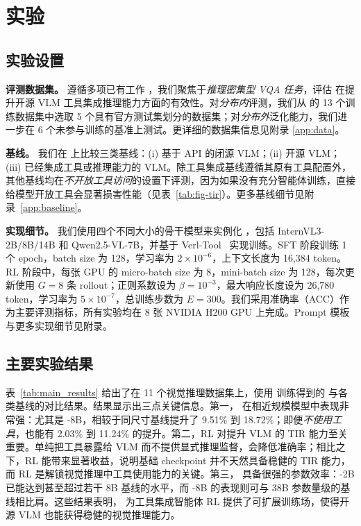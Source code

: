 

\section{实验}
\label{sec:exp}

\subsection{实验设置}
\noindent \textbf{评测数据集。}
遵循多项已有工作 \cite{liu2025visionreasoner,huang2025vision,han2025tiger,li2025self}，我们聚焦于\emph{推理密集型 VQA 任务}，评估 \env{} 在提升开源 VLM 工具集成推理能力方面的有效性。对\emph{分布内}评测，我们从 \env{} 的 13 个训练数据集中选取 5 个具有官方测试集划分的数据集；对\emph{分布外}泛化能力，我们进一步在 6 个未参与训练的基准上测试。更详细的数据集信息见附录 \ref{app:data}。

\noindent \textbf{基线。}
我们在 \env{} 上比较三类基线：(i) 基于 API 的闭源 VLM；(ii) 开源 VLM；(iii) 已经集成工具或推理能力的 VLM。除工具集成基线遵循其原有工具配置外，其他基线均在\emph{不开放工具访问}的设置下评测，因为如果没有充分智能体训练，直接给模型开放工具会显著损害性能（见表~\ref{tab:fig-tir}）。更多基线细节见附录~\ref{app:baseline}。

\noindent \textbf{实现细节。}
我们使用四个不同大小的骨干模型来实例化 \ours{}，包括 InternVL3-2B/8B/14B 和 Qwen2.5-VL-7B，并基于 Verl-Tool~\cite{jiang2025verltool} 实现训练。SFT 阶段训练 1 个 epoch，batch size 为 128，学习率为 $2\times10^{-6}$，上下文长度为 16,384 token。RL 阶段中，每张 GPU 的 micro-batch size 为 8，mini-batch size 为 128，每次更新使用 $G=8$ 条 rollout；正则系数设为 $\beta=10^{-3}$，最大响应长度设为 26,780 token，学习率为 $5\times10^{-7}$，总训练步数为 $E=300$。我们采用准确率（ACC）作为主要评测指标，所有实验均在 8 张 NVIDIA H200 GPU 上完成。Prompt 模板与更多实现细节见附录。

\subsection{主要实验结果}
表~\ref{tab:main_results} 给出了在 11 个视觉推理数据集上，使用 \env{} 训练得到的 \ours{} 与各类基线的对比结果。结果显示出三点关键信息。第一，\ours{} 在相近规模模型中表现非常强：尤其是 \ours{}-8B，相较于同尺寸基线提升了 9.51\% 到 18.72\%；即便\emph{不使用工具}，也能有 2.03\% 到 11.24\% 的提升。第二，RL 对提升 VLM 的 TIR 能力至关重要。单纯把工具暴露给 VLM 而不提供显式推理监督，会降低准确率；相比之下，RL 能带来显著收益，说明基础 checkpoint 并不天然具备稳健的 TIR 能力，而 RL 是解锁视觉推理中工具使用能力的关键。第三，\ours{} 具备很强的参数效率：\ours{}-2B 已能达到甚至超过若干 8B 基线的水平，而 \ours{}-8B 的表现则可与 38B 参数量级的基线相比肩。这些结果表明，\env{} 为工具集成智能体 RL 提供了可扩展训练场，使得开源 VLM 也能获得稳健的视觉推理能力。

